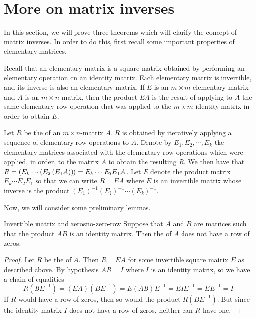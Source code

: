 \section{More on matrix inverses}

In this section, we will prove three theorems which will clarify the concept of matrix inverses. In order to do this, first recall some important properties of elementary matrices. 

Recall that an elementary matrix is a square matrix obtained by performing an elementary operation on an identity matrix. Each elementary matrix is invertible, and its inverse is also an elementary matrix. If $E$ is an $m \times m$ elementary matrix and $A$ is an $m \times n$-matrix, then the product $EA$ is the result of applying to $A$ the same elementary row operation that was applied to the $m \times m$ identity matrix in order to obtain $E$.

Let $R$ be the {\rref} of an $m \times n$-matrix $A$. $R$ is obtained by iteratively applying a sequence of elementary row operations to $A$. Denote by $E_1, E_2, \cdots, E_k$ the elementary matrices associated with the elementary row operations which were applied, in order, to the matrix $A$ to obtain the resulting $R$. We then have that $R = \left(E_k \cdots \left(E_2 \left(E_1A \right) \right)\right) = E_k \cdots E_2E_1A$. Let $E$ denote the product matrix $E_k \cdots E_2E_1$ so that we can write $R=EA$ where $E$ is an invertible matrix whose inverse is the product $(E_1)^{-1}(E_2)^{-1} \cdots (E_k)^{-1}$.

Now, we will consider some preliminary lemmas. 

\begin{lemma}{Invertible matrix and zeros}{no-zero-row}
Suppose that $A$ and $B$ are matrices such that the product $AB$ is an identity matrix. Then the {\rref} of $A$ does not have a row of zeros.
\end{lemma}

\begin{proof}
Let $R$ be the {\rref} of $A$. Then $R=EA$ for some invertible square matrix $E$ as described above. By hypothesis $AB=I$ where $I$ is an identity matrix, so we have a chain of equalities
\begin{equation*}
R(BE^{-1})
=
(EA)(BE^{-1})
=
E(AB)E^{-1}
=
EIE^{-1}
=
EE^{-1}
=
I
\end{equation*}
If $R$ would have a row of zeros, then so would the product $R(BE^{-1})$. But since the identity matrix $I$ does not have a row of zeros, neither can $R$ have one.
\end{proof}

